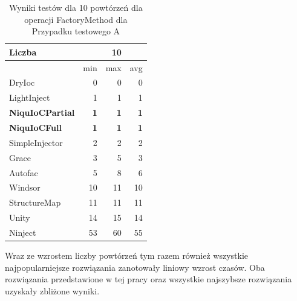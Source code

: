 \documentclass[12pt]{article}
\begin{document}
\begin{table}[H]
\captionsetup{belowskip=0pt,aboveskip=0pt}
\begin{center}
\begin{small}
	\begin{tabular}{ | l | r r r | }
    		\hline
Liczba & & 10 & \\ \hline
 & min & max & avg \\ \hline
DryIoc & 0 & 0 & 0 \\ \hline
LightInject & 1 & 1 & 1 \\ \hline
\textbf{NiquIoCPartial} & \textbf{1} & \textbf{1} & \textbf{1} \\ \hline
\textbf{NiquIoCFull} & \textbf{1} & \textbf{1} & \textbf{1} \\ \hline
SimpleInjector & 2 & 2 & 2 \\ \hline
Grace & 3 & 5 & 3 \\ \hline
Autofac & 5 & 8 & 6 \\ \hline
Windsor & 10 & 11 & 10 \\ \hline
StructureMap & 11 & 11 & 11 \\ \hline
Unity & 14 & 15 & 14 \\ \hline
Ninject & 53 & 60 & 55 \\ \hline
  	\end{tabular}
\end{small}
\end{center}
\caption{Wyniki testów dla 10 powtórzeń dla operacji FactoryMethod dla Przypadku testowego A}
\label{TestCaseA_FactoryMethod10}
\end{table}
Wraz ze wzrostem liczby powtórzeń tym razem również wszystkie najpopularniejsze rozwiązania zanotowały liniowy wzrost czasów. Oba rozwiązania przedstawione w tej pracy oraz wszystkie najszybsze rozwiązania uzyskały zbliżone wyniki.
\\ \\
\end{document}
